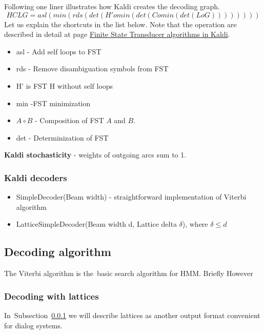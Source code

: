 Following one liner illustrates how Kaldi creates the decoding graph. 
\begin{equation}
   HCLG = asl(min(rds(det(H' o min(det(C o min(det(L o G)))))))) 
\end{equation}
Let us explain the shortcuts in the list below. Note that the operation are described in detail
at page \href{http://kaldi.sourceforge.net/fst_algo.html#fst_algo_stochastic} {Finite State Transducer algorithms in Kaldi}. 
\begin{itemize}
    \item asl - Add self loops to \ac{FST}
    \item rds - Remove disambiguation symbols from \ac{FST}
    \item H' is \ac{FST} H without self loops
    \item min -\ac{FST} minimization
    \item $A\circ B$  - Composition of \ac{FST} $A$ and $B$.
    \item det - Determinization of \ac{FST}
\end{itemize}

{\bf Kaldi stochasticity} - weights of outgoing arcs sum to 1.


\subsubsection*{Kaldi decoders} %
\begin{itemize}
    \item SimpleDecoder(Beam width) - straightforward implementation of Viterbi algorithm
    \item LatticeSimpleDecoder(Beam width d, Lattice delta $\delta$), where $ \delta \le d$

\end{itemize}

\subsection*{Decoding algorithm}
\label{sub:dec_algorithm}
The Viterbi algorithm is the~basic search algorithm for \ac{HMM}. 
Briefly
However


\subsubsection{Decoding with lattices}
\label{sub:lattice}
In~Subsection~\ref{sub:lattice} we will describe lattices as another output format convenient for dialog systems.





